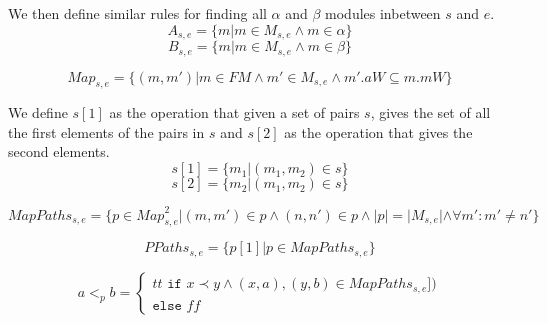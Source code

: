We then define similar rules for finding all $\alpha$ and $\beta$ modules inbetween $s$ and $e$.
\[A_{s,e} = \{m |m \in M_{s,e} \land m \in \alpha\}\]
\[B_{s,e} = \{m |m \in M_{s,e} \land m \in \beta\}\]


\[Map_{s, e} = \{(m, m')| m \in FM \land m' \in M_{s,e} \land m'.aW \subseteq m.mW\} \]

We define $s[1]$ as the operation that given a set of pairs $s$, gives the set of all the first elements of the pairs in $s$ and $s[2]$ as the operation that gives the second elements.
\[s[1] = \{m_1 | (m_1, m_2) \in s\}\]
\[s[2] = \{m_2 | (m_1, m_2) \in s\}\]

\[MapPaths_{s,e} = \{p \in {Map}_{s,e}^2 | (m,m') \in p \land (n,n') \in p \land |p| = |M_{s,e}| \land  \forall m': m' \neq n' \}\]

\[ PPaths_{s,e} = \{p[1] | p \in MapPaths_{s,e}\}\]

\[a <_{p} b = 
\left\{\begin{matrix}
tt \texttt{ if } x \prec y \land (x, a), (y, b) \in MapPaths_{s,e}])\\
\texttt{else } ff

\end{matrix}\right.\]




